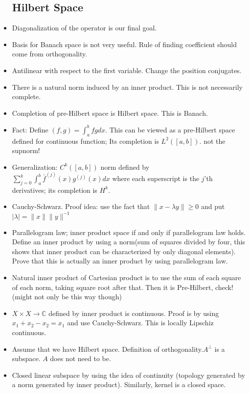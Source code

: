 \documentclass{article}
\theoremstyle{remark}
\begin{document}
\begin{itemize}
\subsection*{Hilbert Space}
\item Diagonalization of the operator is our final goal.
\item Basis for Banach space is not very useful. Rule of finding coefficient should come from orthogonality.
\item Antilinear with respect to the first variable. Change the position conjugates.
\item There is a natural norm induced by an inner product. This is not necessarily complete.
\item Completion of pre-Hilbert space is Hilbert space. This is Banach.
\item Fact: Define $(f,g)=\int^b_a fg dx$. This can be viewed as a pre-Hilbert space defined for continuous function; Its completion is $L^2([a,b])$. not the supnorm!
\item Generalization: $C^k([a,b])$ norm defined by $\sum_{j=0}^k\int_a^b \bar f^{(j)}(x)g^{(j)}(x)dx$ where each superscript is the $j$'th derivatives; its completion is $H^k$.
\item Cauchy-Schwarz. Proof idea: use the fact that $\lVert x-\lambda y\rVert\geq 0$ and put $\mid\lambda\mid=\lVert x\rVert \lVert y\rVert^{-1}$
\item Parallelogram law; inner product space if and only if parallelogram law holds. Define an inner product by using a norm(sum of squares divided by four, this shows that inner product can be characterized by only diagonal elements). Prove that this is actually an inner product by using parallelogram law.
\item Natural inner product of Cartesian product is to use the sum of each square of each norm, taking square root after that. Then it is Pre-Hilbert, check! (might not only be this way though)

\item $X\times X\to\mathbb{C}$ defined by inner product is continuous. Proof is by using $x_1+x_2-x_2=x_1$ and use Cauchy-Schwarz. This is locally Lipschiz continuous.

\item Assume that we have Hilbert space. Definition of orthogonality.$A^\perp$ is a subspace. $A$ does not need to be.

\item Closed linear subspace by using the idea of continuity (topology generated by a norm generated by inner product). Similarly, kernel is a closed space.


\end{itemize}
\end{document}
